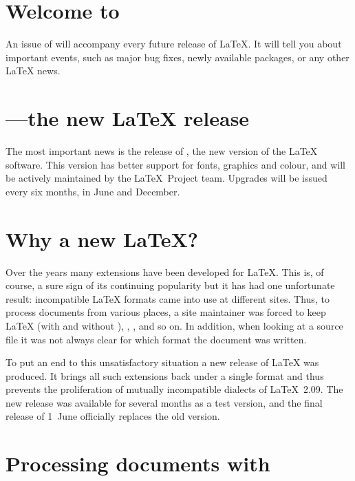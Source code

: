 \documentclass{ltnews}
\begin{document}
\maketitle

\section{Welcome to \LaTeXNews}

An  issue of \emph{\LaTeXNews} will accompany every future release of
\LaTeX.  It will tell you about important events, such as major bug
fixes, newly available packages, or any other \LaTeX{} news.

\section{\LaTeXe---the new \LaTeX{} release}

The most important news is the release of \LaTeXe, the new version of
the \LaTeX{} software.  This version has better support for fonts,
graphics and colour, and will be actively maintained by the \LaTeX\
Project team.  Upgrades will be issued every six months, in June and
December.

\section{Why a new \LaTeX?}

Over the years many extensions have been developed for \LaTeX. This
is, of course, a sure sign of its continuing popularity but it has had
one unfortunate result: incompatible \LaTeX{} formats came into use at
different sites. Thus, to process documents from various places, a
site maintainer was forced to keep \LaTeX{} (with and without \NFSS),
\SLiTeX, \AmSLaTeX, and so on.  In addition, when looking at a source
file it was not always clear for which format the document was written.

To put an end to this unsatisfactory
situation a new release of \LaTeX{} was produced.
It brings all such extensions back under a single format and thus
prevents the proliferation of mutually incompatible dialects of
\LaTeX~2.09. The new release was available for several months as a
test version, and the final release of 1~June officially
replaces the old version.

\section{Processing documents with \LaTeXe}
\end{document}
